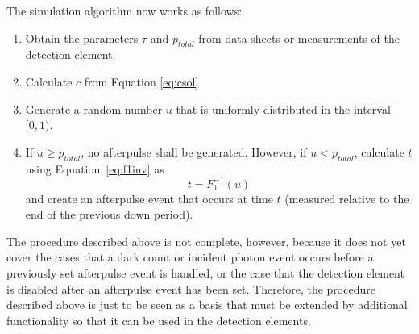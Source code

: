 The simulation algorithm now works as follows:

\begin{enumerate}

\item Obtain the parameters $\tau$ and $p_{total}$ from data sheets or measurements of the detection element.

\item Calculate $c$ from Equation \ref{eq:csol}

\item Generate a random number $u$ that is uniformly distributed in the interval $[0, 1)$.

\item If $u \geq p_{total}$, no afterpulse shall be generated. However, if $u < p_{total}$, calculate $t$ using Equation~\ref{eq:f1inv} as
\begin{equation*}
t=F_1^{-1}(u)
\end{equation*}
and create an afterpulse event that occurs at time $t$ (measured relative to the end of the previous down period).

\end{enumerate}

The procedure described above is not complete, however, because it does not yet cover the cases that a dark count or incident photon event occurs before a previously set afterpulse event is handled, or the case that the detection element is disabled after an afterpulse event has been set. Therefore, the procedure described above is just to be seen as a basis that must be extended by additional functionality so that it can be used in the detection elements.

